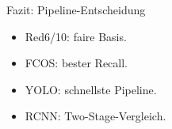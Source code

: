 \begin{frame}{Fazit: Pipeline-Entscheidung}
\small
\begin{itemize}\setlength\itemsep{0.12em}
    \item Red6/10: faire Basis.
    \item FCOS: bester Recall.
    \item YOLO: schnellste Pipeline.
    \item RCNN: Two-Stage-Vergleich.
\end{itemize}
\end{frame}
